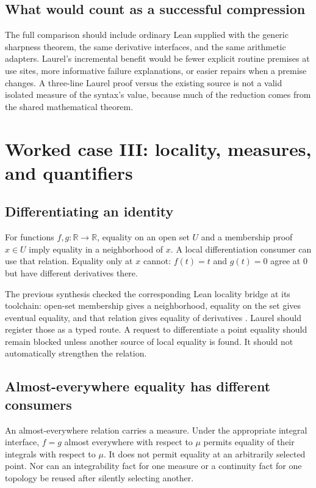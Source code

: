 \documentclass[11pt,a4paper]{article}
\newcommand{\R}{\mathbb R}
\theoremstyle{definition}
\theoremstyle{remark}
\begin{document}
\subsection{What would count as a successful compression}
The full comparison should include ordinary Lean supplied with the generic sharpness theorem, the same derivative interfaces, and the same arithmetic adapters. Laurel's incremental benefit would be fewer explicit routine premises at use sites, more informative failure explanations, or easier repairs when a premise changes. A three-line Laurel proof versus the existing source is not a valid isolated measure of the syntax's value, because much of the reduction comes from the shared mathematical theorem.

\section{Worked case III: locality, measures, and quantifiers}\label{sec:locality}
\subsection{Differentiating an identity}
For functions $f,g:\R\to\R$, equality on an open set $U$ and a membership proof $x\in U$ imply equality in a neighborhood of $x$. A local differentiation consumer can use that relation. Equality only at $x$ cannot: $f(t)=t$ and $g(t)=0$ agree at $0$ but have different derivatives there.

The previous synthesis checked the corresponding Lean locality bridge at its toolchain: open-set membership gives a neighborhood, equality on the set gives eventual equality, and that relation gives equality of derivatives \cite{r3b}. Laurel should register those as a typed route. A request to differentiate a point equality should remain blocked unless another source of local equality is found. It should not automatically strengthen the relation.

\subsection{Almost-everywhere equality has different consumers}
An almost-everywhere relation carries a measure. Under the appropriate integral interface, $f=g$ almost everywhere with respect to $\mu$ permits equality of their integrals with respect to $\mu$. It does not permit equality at an arbitrarily selected point. Nor can an integrability fact for one measure or a continuity fact for one topology be reused after silently selecting another.
\end{document}
